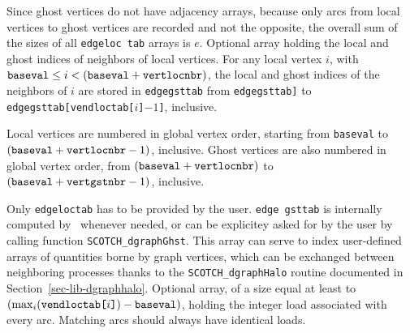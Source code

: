 \begin{itemize}
Since ghost vertices do not have adjacency arrays, because only arcs
from local vertices to ghost vertices are recorded and not the
opposite, the overall sum of the sizes of all {\tt edge\lbt loc\lbt
tab} arrays is $e$.
\iteme[{\tt edgegsttab}]
Optional array holding the local and ghost indices of neighbors of
local vertices.
For any local vertex $i$, with $\mbox{\tt baseval} \leq i < (\mbox{\tt
baseval} + \mbox{\tt vertlocnbr})$, the local and ghost indices
of the neighbors of $i$ are stored in {\tt edge\lbt gst\lbt tab}
from {\tt edge\lbt gst\lbt tab\lbt [vert\lbt loc\lbt tab[$i$]]} to
{\tt edge\lbt gst\lbt tab[vend\lbt loc\lbt tab[$i$]\lbt $- 1$]},
inclusive.

Local vertices are numbered in global vertex order,
starting from {\tt baseval} to $(\mbox{\tt baseval} +
\mbox{\tt vertlocnbr} - 1)$, inclusive. Ghost vertices are also
numbered in global vertex order, from $(\mbox{\tt baseval} +
\mbox{\tt vertlocnbr})$ to $(\mbox{\tt baseval} +
\mbox{\tt vertgstnbr} - 1)$, inclusive.

Only {\tt edgeloctab} has to be provided by the user. {\tt edge\lbt
gst\lbt tab} is internally computed by \ptscotch\ whenever needed,
or can be explicitey asked for by the user by calling function
{\tt SCOTCH\_\lbt dgraph\lbt Ghst}.
This array can serve to index user-defined arrays of quantities borne
by graph vertices, which can be exchanged between neighboring
processes thanks to the {\tt SCOTCH\_\lbt dgraph\lbt Halo}
routine documented in Section~\ref{sec-lib-dgraphhalo}.
\iteme[{\tt edloloctab}]
Optional array, of a size equal at least to $\left(\max_{i}(\mbox{\tt
vend\lbt loc\lbt tab[} i \mbox{\tt ]}) - \mbox{\tt baseval}\right)$,
holding the integer load associated with every arc. Matching arcs
should always have identical loads.
\end{itemize}

